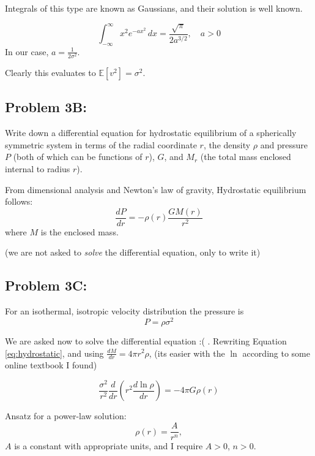 Integrals of this type are known as Gaussians, and their solution is well known. 

\begin{equation}
    \int_{-\infty}^{\infty} x^2 e^{-a x^2} \, dx = \frac{\sqrt{\pi}}{2 a^{3/2}}, \quad a > 0
\end{equation}
    In our case, $a = \frac{1}{2 \sigma^2}$. 

Clearly this evaluates to $\boxed{\mathbb{E}[v^2]  = \sigma^2}$.


\subsection*{Problem 3B:}
Write down a differential equation for hydrostatic equilibrium of a spherically symmetric system in terms of the radial coordinate $r$, the density $\rho$ and pressure $P$ (both of which can be functions of $r$), $G$, and $M_r$ (the total mass enclosed internal to radius $r$).


From dimensional analysis and Newton's law of gravity, Hydrostatic equilibrium follows:
\begin{equation} \label{eq:hydrostatic}
    \boxed{\frac{dP}{dr} = -\rho(r) \frac{GM(r)}{r^2}}
\end{equation}
where $M$ is the enclosed mass. 

(we are not asked to\textit{ solve} the differential equation, only to write it)


\subsection*{Problem 3C:}
For an isothermal, isotropic velocity distribution the pressure is
\begin{equation}
    P = \rho\sigma^2 
\end{equation}

We are asked now to solve the differential equation :( . Rewriting Equation \ref{eq:hydrostatic}, and using $\frac{dM}{dr} = 4\pi r^2 \rho $, (its easier with the $\ln$ according to some online textbook I found)

\begin{equation}\label{eq:ode_3c}
    \frac{\sigma^2}{r^2} \frac{d}{dr}(r^2 \frac{d\ln{\rho}}{dr}) = -4\pi G \rho(r)
\end{equation}

Ansatz for a power-law solution:
\begin{equation}
    \rho(r) = \frac{A}{r^n},
\end{equation}
$A$ is a constant with appropriate units, and  I require $A>0$, $n>0$.

